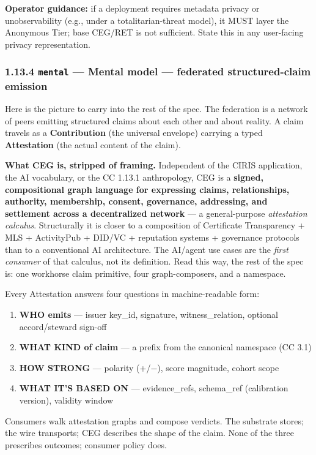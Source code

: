 \documentclass[11pt]{article}
\begin{document}
\textbf{Operator guidance:} if a deployment requires metadata privacy or unobservability (e.g., under a totalitarian-threat model), it MUST layer the Anonymous Tier; base CEG/RET is not sufficient. State this in any user-facing privacy representation.


\subsubsection*{1.13.4 \texttt{mental} — Mental model — federated structured-claim emission}


Here is the picture to carry into the rest of the spec. The federation is a network of peers emitting structured claims about each other and about reality. A claim travels as a \textbf{Contribution} (the universal envelope) carrying a typed \textbf{Attestation} (the actual content of the claim).


\textbf{What CEG is, stripped of framing.} Independent of the CIRIS application, the AI vocabulary, or the CC 1.13.1 anthropology, CEG is a \textbf{signed, compositional graph language for expressing claims, relationships, authority, membership, consent, governance, addressing, and settlement across a decentralized network} — a general-purpose \textit{attestation calculus}. Structurally it is closer to a composition of Certificate Transparency + MLS + ActivityPub + DID/VC + reputation systems + governance protocols than to a conventional AI architecture. The AI/agent use cases are the \textit{first consumer} of that calculus, not its definition. Read this way, the rest of the spec is: one workhorse claim primitive, four graph-composers, and a namespace.


Every Attestation answers four questions in machine-readable form:


\begin{enumerate}\setlength\itemsep{0pt}
\item \textbf{WHO emits} — issuer key\_id, signature, witness\_relation, optional accord/steward sign-off
\item \textbf{WHAT KIND of claim} — a prefix from the canonical namespace (CC 3.1)
\item \textbf{HOW STRONG} — polarity (+/−), score magnitude, cohort scope
\item \textbf{WHAT IT'S BASED ON} — evidence\_refs, schema\_ref (calibration version), validity window
\end{enumerate}


Consumers walk attestation graphs and compose verdicts. The substrate stores; the wire transports; CEG describes the shape of the claim. None of the three prescribes outcomes; consumer policy does.
\end{document}
